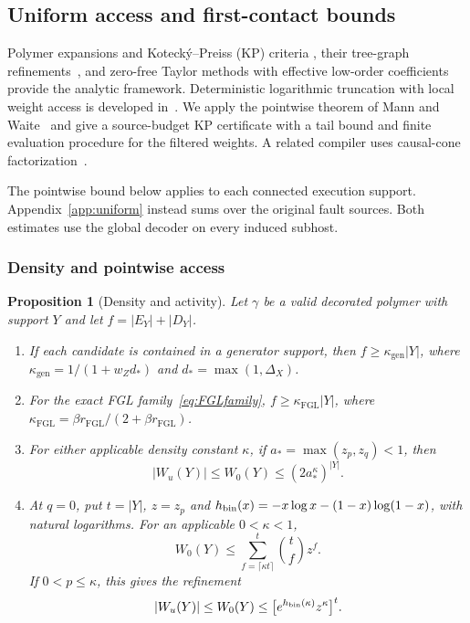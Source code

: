 \documentclass[10pt,twocolumn]{article}
\newtheorem{proposition}[theorem]{Proposition}
\theoremstyle{definition}
\newcommand{\rF}{r_{\mathrm{FGL}}}
\newcommand{\kF}{\kappa_{\mathrm{FGL}}}
\newcommand{\kG}{\kappa_{\mathrm{gen}}}
\begin{document}
\subsection{Uniform access and first-contact bounds}\label{app:access-proofs}
Polymer expansions and Koteck\'y--Preiss (KP) criteria
\cite{KP86,Uel04}, their tree-graph refinements~\cite{FP07}, and
zero-free Taylor methods with effective low-order coefficients
\cite[Secs.~2--3]{PR17} provide the analytic framework.
Deterministic logarithmic truncation with local weight access is developed
in~\cite[Thm.~2.2]{HPR20}. We apply the pointwise theorem of Mann and
Waite~\cite{MW25} and give a source-budget KP certificate with a tail
bound and finite evaluation procedure for the filtered weights. A
related compiler uses causal-cone factorization~\cite[Thm.~3]{MM23}.

The pointwise bound below applies to each connected execution support.
Appendix~\ref{app:uniform} instead sums over the original fault sources.
Both estimates use the global decoder on every induced subhost.

\subsubsection{Density and pointwise access}
\begin{proposition}[Density and activity]\label{prop:density}
Let $\gamma$ be a valid decorated polymer with support $Y$ and let
$f=|E_Y|+|D_Y|$.
\begin{enumerate}
\item[(a)] If each candidate is contained in a generator support, then
$f\ge\kG|Y|$, where $\kG=1/(1+w_Zd_\ast)$ and
$d_\ast=\max(1,\Delta_X)$.
\item[(b)] For the exact FGL family~\eqref{eq:FGLfamily},
$f\ge\kF|Y|$, where $\kF=\beta\rF/(2+\beta\rF)$.
\item[(c)] For either applicable density constant $\kappa$, if
$a_\ast=\max(z_p,z_q)<1$, then
\[
 |W_u(Y)|\le W_0(Y)\le(2a_\ast^{\kappa})^{|Y|}.
\]
\item[(d)] At $q=0$, put $t=|Y|$, $z=z_p$ and
$h_{\rm bin}(x)=-x\log x-(1-x)\log(1-x)$, with natural logarithms.
For an applicable $0<\kappa<1$,
\[
 W_0(Y)\le\sum_{f=\lceil\kappa t\rceil}^{t}\binom{t}{f}z^f.
\]
If $0<p\le\kappa$, this gives the refinement
\begin{equation}\label{eq:entropy-activity}
 |W_u(Y)|\le W_0(Y)\le
 \bigl[e^{h_{\rm bin}(\kappa)}z^{\kappa}\bigr]^t.
\end{equation}
\end{enumerate}
\end{proposition}
\end{document}
